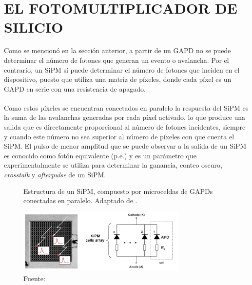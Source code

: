 \section{EL FOTOMULTIPLICADOR DE SILICIO}
Como se mencionó en la sección anterior, a partir de un GAPD no se puede determinar el número de fotones que generan un evento o avalancha. Por el contrario, un SiPM sí puede determinar el número de fotones que inciden en el dispositivo, puesto que utiliza una matriz de píxeles, donde cada píxel es un  GAPD en serie con una resistencia de apagado. \\ \\
Como estos píxeles se encuentran conectados en paralelo la respuesta del SiPM es la suma de las avalanchas generadas por cada píxel activado, lo que produce una salida que es directamente proporcional al número de fotones incidentes, siempre y cuando este número no sea superior al número de píxeles con que cuenta el SiPM. El pulso de menor amplitud que se puede observar a la salida de un SiPM es conocido como fotón equivalente (p.e.) y es un parámetro que experimentalmente se utiliza para determinar la ganancia, conteo oscuro, \textit{crosstalk} y \textit{afterpulse} de un SiPM.
\begin{figure}[h!]
\begin{centering}
    \caption{Estructura de un SiPM, compuesto por microceldas de GAPDs conectadas en paralelo. Adaptado de \citep{Muon_counting_Amiga}.}
    \includegraphics[width=0.75\textwidth]{Images/APD_array.PNG}
    \caption*{Fuente:}
    \label{fig:APD_array}  
  \par\end{centering}
\end{figure}

